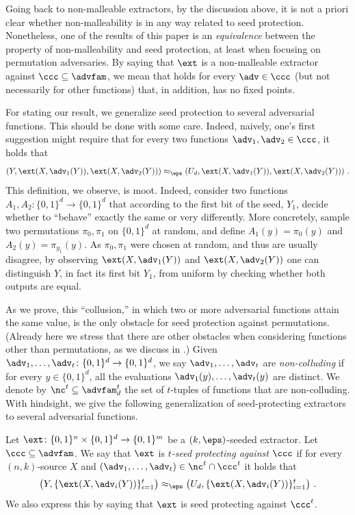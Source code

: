 Going back to non-malleable extractors, by the discussion above, it is not a priori clear whether non-malleability is in any way related to seed protection. Nonetheless, one of the results of %
this paper %
is an \emph{equivalence} between the property of non-malleability and seed protection, at least when focusing on permutation adversaries. By saying that $\ext$ is a non-malleable extractor against $\ccc \subseteq \advfam$, we mean that  holds for every $\adv \in \ccc$ (but not necessarily for other functions) that, in addition, has no fixed points. 

For stating our result, we generalize seed protection to several adversarial functions. This should be done with some care. Indeed, naively, one's first suggestion might require that for every two functions $\adv_1,\adv_2 \in \ccc$, it holds that
\[
\left(Y, \ext(X,\adv_1(Y)),\ext(X,\adv_2(Y))\right) \approx_\eps \left(U_d, \ext(X,\adv_1(Y)),\ext(X,\adv_2(Y))\right)\,.
\]
This definition, we observe, is moot. Indeed, consider two functions $A_1, A_2 \colon \{0,1\}^d \to \{0,1\}^d$ that according to the first bit of the seed, $Y_1$, decide whether to ``behave'' exactly the same or very differently. More concretely, sample two permutations $\pi_0,\pi_1$ on $\{0,1\}^d$ at random, and define $A_1(y) = \pi_0(y)$ and $A_2(y) = \pi_{y_1}(y)$.
As $\pi_0,\pi_1$ were chosen at random, and thus are usually disagree, by observing $\ext(X,\adv_1(Y))$ and $\ext(X,\adv_2(Y))$ one can distinguish $Y$, in fact its first bit $Y_1$, from uniform by checking whether both outputs are equal.

As we prove, this %
``collusion,''  %
%
in which two or more  %
adversarial functions attain the same value, is the only obstacle for seed protection against permutations.  %
%
(Already  %
here we stress that there are other obstacles when considering functions other than permutations, as we discuss
in .) %
%
Given $\adv_1,\ldots,\adv_t \colon \{0,1\}^d \rightarrow \{0,1\}^d$, we say $\adv_1,\ldots,\adv_t$ are
\emph{non-colluding} if for every $y \in \{0,1\}^d$, all the evaluations $\adv_1(y),\ldots,\adv_{t}(y)$ are distinct. We denote by $\nc^t \subseteq \advfam^t_d$ the set of $t$-tuples of functions that are non-colluding.
%
%
%
%
With hindsight, we give the following generalization of seed-protecting extractors to several adversarial functions.

\begin{definition}
Let $\ext \colon \{0,1\}^n \times \{0,1\}^d \to \{0,1\}^m$ be a $(k,\eps)$-seeded extractor. Let $\ccc \subseteq \advfam$. We say that $\ext$ is \emph{$t$-seed protecting against $\ccc$}
if for every $(n,k)$-source $X$ and $(\adv_1,\ldots,\adv_t) \in \nc^t \cap \ccc^t$ it holds that
\[
\left(Y, \{\ext(X,\adv_i(Y))\}_{i=1}^{t}\right) \approx_\eps \left(U_d, \{\ext(X,\adv_i(Y))\}_{i=1}^{t}\right)\,.
\]
We also express this by saying that $\ext$ is seed protecting against $\ccc^t$.
\end{definition}

